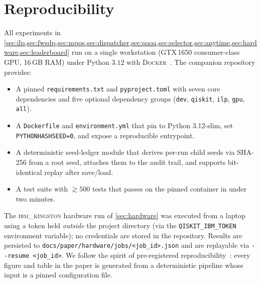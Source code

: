 \documentclass{article}
\begin{document}
\section{Reproducibility}
\label{sec:repro}

All experiments in \cref{sec:ilp,sec:fwsdp,sec:mpqs,sec:dispatcher,sec:qaoa,sec:selector,sec:anytime,sec:hardware,sec:leaderboard}
run on a single workstation (GTX\,1650 consumer-class GPU, 16\,GB RAM)
under Python $3.12$ with \textsc{Docker}~\cite{docker}. The companion
repository provides:
\begin{itemize}
  \item A pinned \texttt{requirements.txt} and \texttt{pyproject.toml}
        with seven core dependencies and five optional dependency groups
        (\texttt{dev}, \texttt{qiskit}, \texttt{ilp}, \texttt{gpu},
        \texttt{all}).
  \item A \texttt{Dockerfile} and \texttt{environment.yml} that pin
        to Python 3.12-slim, set \texttt{PYTHONHASHSEED=0}, and expose
        a reproducible entrypoint.
  \item A deterministic seed-ledger module that derives per-run child
        seeds via SHA-256 from a root seed, attaches them to the audit
        trail, and supports bit-identical replay after save/load.
  \item A test suite with $\gtrsim 500$ tests that passes on the pinned
        container in under two minutes.
\end{itemize}
\begin{sloppypar}
The \textsc{ibm\_kingston} hardware run of \cref{sec:hardware} was
executed from a laptop using a token held
\emph{outside} the project directory (via the \texttt{QISKIT\_IBM\_TOKEN}
environment variable); no credentials are stored in the repository.
Results are persisted to \texttt{docs/paper/hardware/jobs/\textless{}job\_id\textgreater{}.json}
and are replayable via \texttt{-{}-resume \textless{}job\_id\textgreater{}}. We follow the spirit
of pre-registered reproducibility~\cite{ioannidis2005why}: every figure
and table in the paper is generated from a deterministic pipeline whose
input is a pinned configuration file.
\end{sloppypar}

\end{document}
